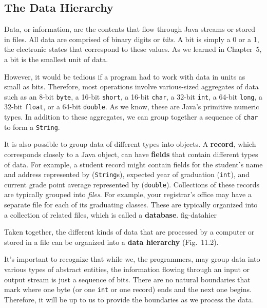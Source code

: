 \subsection{The Data Hierarchy}
\noindent Data, or information, are the contents that flow through
Java streams or stored in files.  All data are comprised of binary
digits or {\it bits}. A bit is simply a 0 or a 1, the electronic
states that correspond to these values.  As we learned in Chapter~5, a
bit is the smallest unit of data.

However, it would be tedious if a program had to work with data in units
as small as bits.  Therefore, most operations involve various-sized
aggregates of data such as an 8-bit {\tt byte}, a 16-bit {\tt short},
a 16-bit {\tt char}, a 32-bit {\tt int}, a 64-bit {\tt long}, a 32-bit
{\tt float}, or a 64-bit {\tt double}. As we know, these are Java's
primitive numeric types.   In addition to these aggregates, we can
group together a sequence of {\tt char} to form a {\tt String}.

It is also possible to group data of different types into objects.   A
{\bf record}, which corresponds closely to a Java object, can have
{\bf fields} that contain different types of data.   For example, a
student record might contain fields for the student's name and address
represented by ({\tt String}s), expected year of graduation ({\tt int}), and current
grade point average represented by ({\tt double}).  Collections of these records are
typically grouped into {\em files}. For example, your
registrar's office may have a separate file for each of its graduating
classes.  These are typically organized into a collection of related
files, which is called a {\bf database}.
{fig-datahier}

Taken together, the different kinds of data that are processed by a
computer or stored in a file can be organized into a {\bf data
hierarchy} (Fig.~11\mbox{.}2).

It's important to recognize that while we, the programmers, may group
data into various types of abstract entities, the information flowing
through an input or output stream is just a sequence of bits.  There
are no natural boundaries that mark where one byte (or one {\tt int}
or one record) ends and the next one begins.   Therefore, it will be up
to us to provide the boundaries as we process the data.


